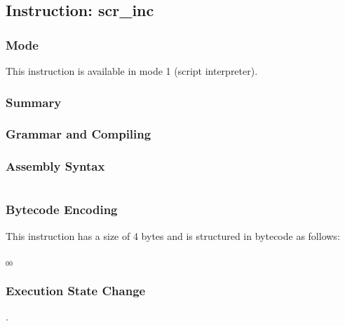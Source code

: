 \subsection{Instruction: scr\_inc}

\subsubsection{Mode}
This instruction is available in mode 1 (script interpreter).
\subsubsection{Summary}


\subsubsection{Grammar and Compiling}


\subsubsection{Assembly Syntax}

\begin{myquote}
\begin{verbatim}

\end{verbatim}
\end{myquote}

\subsubsection{Bytecode Encoding}

This instruction has a size of 4 bytes and is structured in bytecode as follows:

$_{00}$\ 

\subsubsection{Execution State Change}

.


